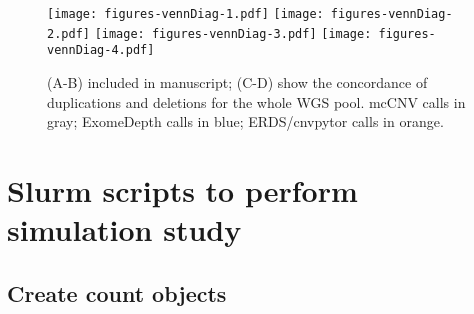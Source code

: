 \documentclass{article}\usepackage[]{graphicx}\usepackage[]{color}
\begin{document}
\begin{figure}
  \centering
  \texttt{[image: figures-vennDiag-1.pdf]}%
  \texttt{[image: figures-vennDiag-2.pdf]}
  \texttt{[image: figures-vennDiag-3.pdf]}%
  \texttt{[image: figures-vennDiag-4.pdf]}
  \caption{(A-B) included in manuscript; (C-D) show the concordance of duplications and deletions for the whole WGS pool. mcCNV calls in gray; ExomeDepth calls in blue; ERDS/cnvpytor calls in orange.}
\end{figure}

\section{Slurm scripts to perform simulation study}

\subsection{Create count objects}
\end{document}
